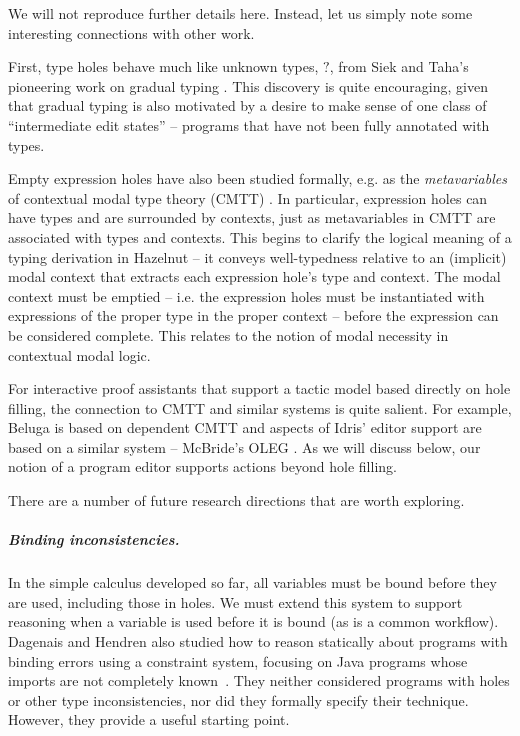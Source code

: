 \documentclass[letterpaper,USenglish]{lipics-v2016}
\begin{document}
 We will not reproduce further details here. Instead, let us simply note some interesting connections with other work. 

 First, type holes behave much like unknown types, $?$, from Siek and Taha's pioneering work on gradual typing \cite{Siek06a}. This discovery is quite encouraging, given that gradual typing is also motivated by a 
desire to make sense of one class of ``intermediate edit states'' -- programs that
have not been fully annotated with types.

Empty expression holes have also been studied formally, e.g. as the \emph{metavariables} 
of contextual modal type theory (CMTT) \cite{DBLP:journals/tocl/NanevskiPP08}. In particular, expression
holes can have types and are surrounded by contexts, just as metavariables in
CMTT are associated with types and contexts. This begins to clarify the
logical meaning of a typing derivation in Hazelnut -- it conveys
well-typedness relative to an (implicit) modal context that extracts each
expression hole's type and context. The modal context must be emptied --
i.e. the expression holes must be instantiated with expressions of the
proper type in the proper context -- before the expression can be
considered complete. This relates to the notion of modal necessity in
contextual modal logic.

For interactive
proof assistants that support a tactic model based directly on hole
filling, the connection to CMTT and similar systems is quite salient. For
example, Beluga \cite{DBLP:conf/flops/Pientka10} is based on dependent CMTT
and aspects of Idris' editor support \cite{brady2013idris} are based on a similar system -- 
McBride's OLEG \cite{mcbride2000dependently}. 
As we will discuss below, our notion of a program editor supports actions beyond hole filling.

There are a number of future research directions that are worth exploring.

\vspace{-10px}
\subparagraph{Binding inconsistencies.} In the simple calculus developed so far,
    all variables must be bound before they are used,
    including those in holes. We must extend this system to support reasoning
    when a variable is used before it is bound (as is a common workflow). Dagenais and
    Hendren also studied how to reason statically about programs
    with binding errors using a constraint system, focusing on
    Java programs whose imports are not completely known~\cite{DBLP:conf/oopsla/DagenaisH08}. They neither
    considered programs with holes or other type inconsistencies,
    nor did they formally specify their
    technique. However, they provide a useful starting point.
\end{document}
